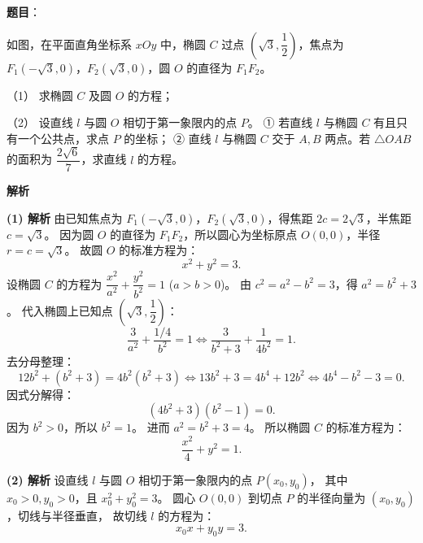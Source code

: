 \begin{answer}

\textbf{题目}：

如图，在平面直角坐标系 $xOy$ 中，椭圆 $C$ 过点 $\left(\sqrt{3}, \dfrac{1}{2}\right)$，焦点为 $F_1(-\sqrt{3}, 0)$，$F_2(\sqrt{3}, 0)$，圆 $O$ 的直径为 $F_1F_2$。

（1） 求椭圆 $C$ 及圆 $O$ 的方程；

（2） 设直线 $l$ 与圆 $O$ 相切于第一象限内的点 $P$。
① 若直线 $l$ 与椭圆 $C$ 有且只有一个公共点，求点 $P$ 的坐标；
② 直线 $l$ 与椭圆 $C$ 交于 $A, B$ 两点。若 $\triangle OAB$ 的面积为 $\dfrac{2\sqrt{6}}{7}$，求直线 $l$ 的方程。
\nopagebreak[4]
\begin{center}\end{center}
\nopagebreak[4]
\textbf{解析}

\textbf{(1) 解析}
由已知焦点为 $F_1(-\sqrt{3}, 0)$，$F_2(\sqrt{3}, 0)$，得焦距 $2c = 2\sqrt{3}$，半焦距 $c = \sqrt{3}$。
因为圆 $O$ 的直径为 $F_1F_2$，所以圆心为坐标原点 $O(0, 0)$，半径 $r = c = \sqrt{3}$。
故圆 $O$ 的标准方程为：
\nopagebreak[4]
\[x^2 + y^2 = 3.\]
设椭圆 $C$ 的方程为 $\dfrac{x^2}{a^2} + \dfrac{y^2}{b^2} = 1$ ($a > b > 0$)。
由 $c^2 = a^2 - b^2 = 3$，得 $a^2 = b^2 + 3$。
代入椭圆上已知点 $\left(\sqrt{3}, \dfrac{1}{2}\right)$：
\nopagebreak[4]
\[\frac{3}{a^2} + \frac{1/4}{b^2} = 1 \iff \frac{3}{b^2 + 3} + \frac{1}{4b^2} = 1.\]
去分母整理：
\nopagebreak[4]
\[12b^2 + (b^2 + 3) = 4b^2(b^2 + 3) \iff 13b^2 + 3 = 4b^4 + 12b^2 \iff 4b^4 - b^2 - 3 = 0.\]
因式分解得：
\nopagebreak[4]
\[(4b^2 + 3)(b^2 - 1) = 0.\]
因为 $b^2 > 0$，所以 $b^2 = 1$。
进而 $a^2 = b^2 + 3 = 4$。
所以椭圆 $C$ 的标准方程为：
\nopagebreak[4]
\[\frac{x^2}{4} + y^2 = 1.\]

\textbf{(2) 解析}
设直线 $l$ 与圆 $O$ 相切于第一象限内的点 $P(x_0, y_0)$，
其中 $x_0 > 0, y_0 > 0$，且 $x_0^2 + y_0^2 = 3$。
圆心 $O(0, 0)$ 到切点 $P$ 的半径向量为 $(x_0, y_0)$，切线与半径垂直，
故切线 $l$ 的方程为：
\nopagebreak[4]
\[x_0 x + y_0 y = 3.\]


\end{answer}
